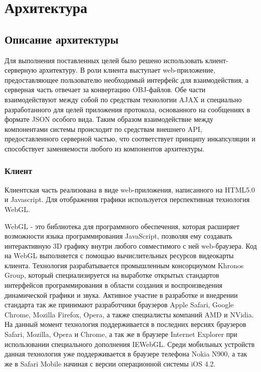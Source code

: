 \section{Архитектура}

\subsection{Описание архитектуры}

Для выполнения поставленных целей было решено использовать клиент-серверную
архитектуру. В роли клиента выступает web-приложение, предоставляющее
пользователю необходимый интерфейс для взаимодействия, а серверная часть
отвечает за конвертацию OBJ-файлов. Обе части
взаимодействуют между собой по средствам технологии AJAX и специально
разработанного для целей приложения протокола, основанного на сообщениях в
формате JSON особого вида. Таким образом взаимодействие между компонентами системы
происходит по средствам внешнего API, предоставленного серверной частью,
что соответствует принципу инкапсуляции и способствует заменяемости
любого из компонентов архитектуры.

\subsubsection{Клиент}

Клиентская часть реализована в виде web-приложения, написанного
на HTML5.0 и Javascript. Для отображения графики используется
перспективная технология WebGL.

WebGL\cite{webgl} - это библиотека для программного обеспечения, которая расширяет
возможности языка программирования JavaScript, позволяя ему создавать
интерактивную 3D графику внутри любого совместимого с ней web-браузера. Код на
WebGL выполняется с помощью вычислительных ресурсов видеокарты клиента. Технология
разрабатывается промышленным консорциумом Khronos Group, который
специализируется на выработке открытых стандартов интерфейсов программирования в
области создания и воспроизведения динамической графики и звука. Активное
участие в разработке и внедрении стандарта так же принимают разработчики
браузеров Apple Safari, Google Chrome, Mozilla Firefox, Opera,  а также
специалисты компаний AMD и NVidia. На данный момент технология поддерживается в
последних версиях браузеров Safari, Mozilla, Opera и Chrome, а так же в браузере
Internet Explorer при использовании специального дополнения IEWebGL. Среди
мобильных устройств данная технология уже поддерживается в браузере телефона
Nokia N900, а так же в Safari Mobile начиная с версии операционной системы iOS
4.2.

